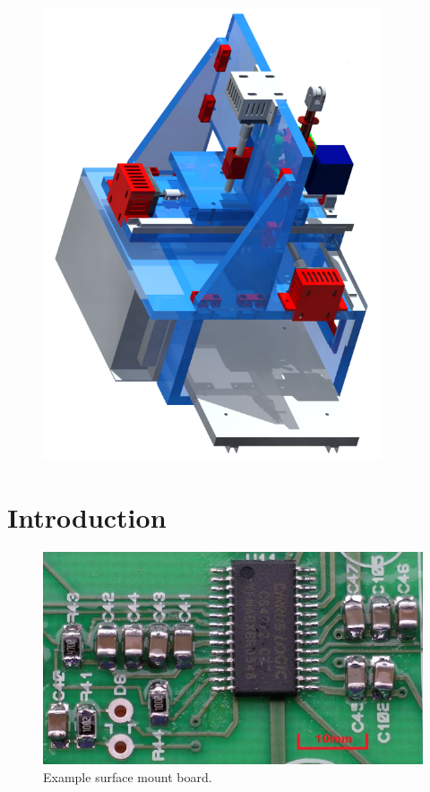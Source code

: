 \maketitle

\begin{figure}[ht!]
\centering
\includegraphics[width=100mm]{resources/render.png}
\label{render}
\end{figure}

\newpage
\tableofcontents

\newpage

\section{Introduction}

\begin{figure}[ht!]
\centering
\includegraphics[width=120mm]{resources/smt_soldering.jpg}
\caption{Example surface mount board.}
\label{smdexample}
\end{figure}

